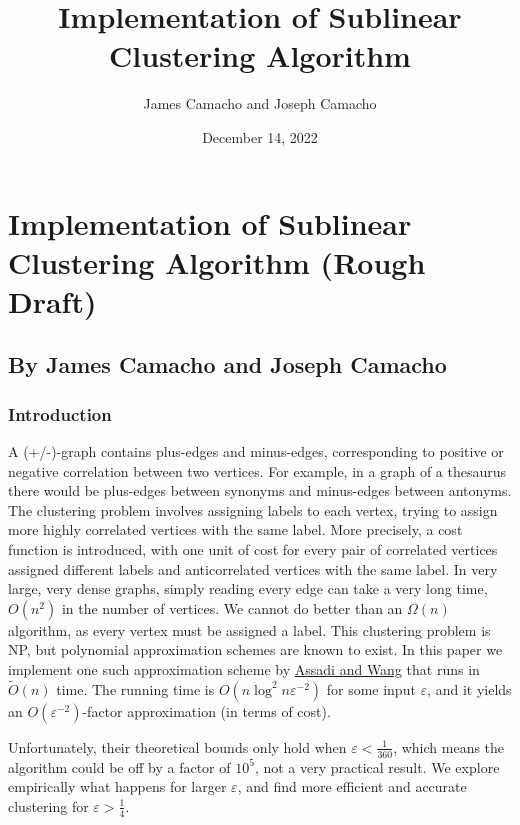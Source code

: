 \documentclass[
]{article}
\title{Implementation of Sublinear Clustering Algorithm}
\author{James Camacho and Joseph Camacho}
\date{December 14, 2022}
\begin{document}
\maketitle

\hypertarget{implementation-of-sublinear-clustering-algorithm-rough-draft}{%
  \section{Implementation of Sublinear Clustering Algorithm (Rough
    Draft)}\label{implementation-of-sublinear-clustering-algorithm-rough-draft}}

\hypertarget{by-james-camacho-and-joseph-camacho}{%
  \subsection{By James Camacho and Joseph
    Camacho}\label{by-james-camacho-and-joseph-camacho}}

\hypertarget{introduction}{%
  \subsubsection{Introduction}\label{introduction}}

A (+/-)-graph contains plus-edges and minus-edges, corresponding to positive or negative correlation between two vertices. For example, in a graph of a thesaurus there would be plus-edges between synonyms and minus-edges between antonyms. The clustering problem involves assigning labels to each vertex, trying to assign more highly correlated vertices with the same label. More precisely, a cost function is introduced, with one unit of cost for every pair of correlated vertices assigned different labels and anticorrelated vertices with the same label. In very large, very dense graphs, simply reading every edge can take a very long time, $O(n^2)$ in the number of vertices. We cannot do better than an $\Omega(n)$ algorithm, as every vertex must be assigned a label. This clustering problem is NP, but polynomial approximation schemes are known to exist. In this paper we implement one such approximation scheme by \href{https://doi.org/10.48550/arxiv.2109.14528}{Assadi and Wang} that runs in $\tilde{O}(n)$ time. The running time is $O(n\log^2 n\varepsilon^{-2})$ for some input $\varepsilon$, and it yields an $O(\varepsilon^{-2})$-factor approximation (in terms of cost).

Unfortunately, their theoretical bounds only hold when $\varepsilon < \frac{1}{360}$, which means the algorithm could be off by a factor of $10^5$, not a very practical result. We explore empirically what happens for larger $\varepsilon$, and find more efficient and accurate clustering for $\varepsilon > \frac14$.
\end{document}
